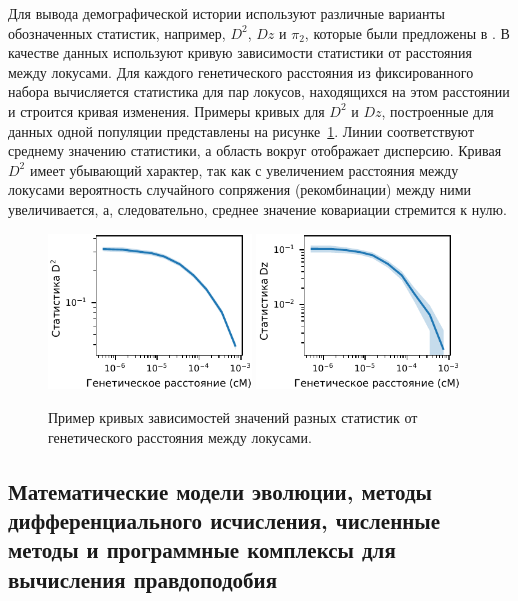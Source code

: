 Для вывода демографической истории используют различные варианты обозначенных статистик, например, $D^2$, $Dz$ и $\pi_2$, которые были предложены в \cite{ragsdale2019models}.
В качестве данных используют кривую зависимости статистики от расстояния между локусами.
Для каждого генетического расстояния из фиксированного набора вычисляется статистика для пар локусов, находящихся на этом расстоянии и строится кривая изменения.
Примеры кривых для $D^2$ и $Dz$, построенные для данных одной популяции представлены на рисунке~\ref{fig:part1:dem_inf:ld_decay_data}.
Линии соответствуют среднему значению статистики, а область вокруг отображает дисперсию.
Кривая $D^2$ имеет убывающий характер, так как с увеличением расстояния между локусами вероятность случайного сопряжения (рекомбинации) между ними увеличивается, а, следовательно, среднее значение ковариации стремится к нулю.

\begin{figure}
    \centering
    \includegraphics[width=0.48\textwidth]{images/part1/data/d2_ld_decay.pdf}
    \includegraphics[width=0.48\textwidth]{images/part1/data/dz_ld_decay.pdf}
    \caption{Пример кривых зависимостей значений разных статистик от генетического расстояния между локусами.}
    \label{fig:part1:dem_inf:ld_decay_data}
\end{figure}


\subsection{Математические модели эволюции, методы дифференциального исчисления, численные методы и программные комплексы для вычисления правдоподобия}
\label{sec:part1:dem_inf:ll_methods}

